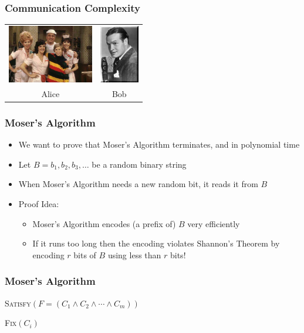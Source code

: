 \documentclass{beamer}
\begin{document}
\frame
{
  \frametitle{Communication Complexity}
 
  \begin{center} 
    \begin{tabular}{cc}
      \includegraphics[height=1in]{alice3} 
         & \includegraphics[height=1in]{bob-hope} \\
      Alice & Bob 
    \end{tabular}
  \end{center}
}

\frame
{
  \frametitle{Moser's Algorithm}
  \begin{itemize}
    \item We want to prove that Moser's Algorithm terminates, and in
polynomial time
    \item Let $B=b_1,b_2,b_3,\ldots$ be a random binary string
    \item When Moser's Algorithm needs a new random bit, it reads it from $B$
    \item Proof Idea:
    \begin{itemize}
      \item Moser's Algorithm encodes (a prefix of) $B$ very efficiently
      \item If it runs too long then the encoding violates Shannon's Theorem
        by encoding $r$ bits of $B$ using less than $r$ bits!
    \end{itemize}
  \end{itemize}
}

\frame
{
  \frametitle{Moser's Algorithm}

  \noindent\textsc{Satisfy$(F=(C_1\wedge C_2\wedge\cdots\wedge C_m))$}
  \begin{algorithmic}
     \ENDIF
   \ENDFOR
  \end{algorithmic}
  \vspace{1ex}
  \noindent\textsc{Fix$(C_i)$}
  \begin{algorithmic}
     \ENDIF
   \ENDFOR
  \end{algorithmic}
}
\end{document}
